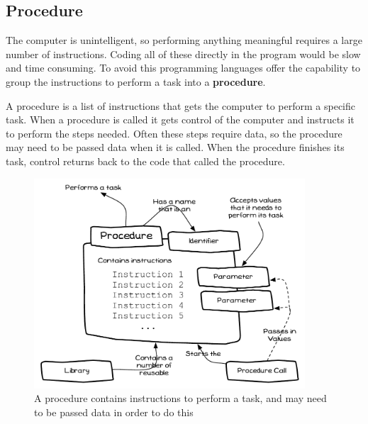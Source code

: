 \clearpage
\subsection{Procedure} %
\label{sub:procedure}

The computer is unintelligent, so performing anything meaningful requires a large number of instructions. Coding all of these directly in the program would be slow and time consuming. To avoid this programming languages offer the capability to group the instructions to perform a task into a \textbf{procedure}. 

A procedure is a list of instructions that gets the computer to perform a specific task. When a procedure is called it gets control of the computer and instructs it to perform the steps needed. Often these steps require data, so the procedure may need to be passed data when it is called. When the procedure finishes its task, control returns back to the code that called the procedure.

\begin{figure}[h]
   \centering
   \includegraphics[width=0.9\textwidth]{./topics/program-creation/diagrams/Procedure} 
   \caption{A procedure contains instructions to perform a task, and may need to be passed data in order to do this}
   \label{fig:program-creation-procedure}
\end{figure}


